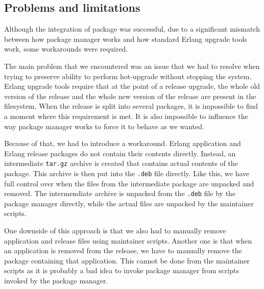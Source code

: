 \subsection{Problems and limitations}

Although the integration of package was successful, due to a significant mismatch between
how package manager works and how standard Erlang upgrade tools work, some workarounds
were required.

The main problem that we encountered was an issue that we had to resolve when trying
to preserve ability to perform hot-upgrade without stopping the system. Erlang upgrade tools
require that at the point of a release upgrade, the whole old version of the release and the whole new
version of the release are present in the filesystem. When the release is split into several packages, 
it is impossible to find a moment where this requirement is met. It is also impossible to
influence the way package manager works to force it to behave as we wanted.

Because of that, we had to introduce a workaround. Erlang application and Erlang release packages
do not contain their contents directly. Instead, an intermediate {\tt tar.gz} archive is created that
contains actual contents of the package. This archive is then put into the {\tt .deb} file directly.
Like this, we have full control over when the files from the intermediate package are unpacked and
removed. The intermendiate archive is unpacked from the {\tt .deb} file by the package manager directly, while
the actual files are unpacked by the maintainer scripts.

One downside of this approach is that we also had to manually remove application and release files using maintainer scripts.
Another one is that when an application is removed from the release, we have to manually remove the package containing that
application. This cannot be done from the maintainer scripts as it is probably a bad idea to invoke package manager from scripts
invoked by the package manager.
